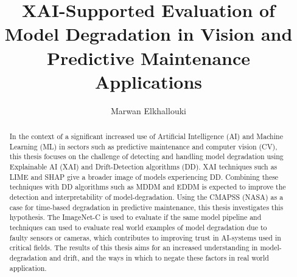 \documentclass[english]{hogent-article}
\title{XAI-Supported Evaluation of Model Degradation in Vision and Predictive Maintenance Applications}
\author{Marwan Elkhallouki}
\begin{document}
\begin{abstract}
In the context of a significant increased use of Artificial Intelligence (AI) and Machine Learning (ML) in sectors such as predictive maintenance and computer vision (CV), this thesis focuses on the challenge of detecting and handling model degradation using Explainable AI (XAI) and Drift-Detection algorithms (DD).
XAI techniques such as LIME \autocite{garreau2020explaining} and SHAP \autocite{VandenBroeck2022} give a broader image of models experiencing DD.
Combining these techniques with DD algorithms such as MDDM \autocite{Pesaranghader2017} and EDDM \autocite{baena2006early} is expected to improve the detection and interpretability of model-degradation.
Using the CMAPSS (NASA) \autocite{Saxena2008} as a case for time-based degradation in predictive maintenance, this thesis investigates this hypothesis.
The ImageNet-C \autocite{Hendrycks2019} is used to evaluate if the same model pipeline and techniques can used to evaluate real world examples of model degradation due to faulty sensors or cameras, which contributes to improving trust in AI-systems used in critical fields.
The results of this thesis aims for an increased understanding in model-degradation and drift, and the ways in which to negate these factors in real world application.
\end{abstract}

\tableofcontents



\printbibliography[heading=bibintoc]
\end{document}
